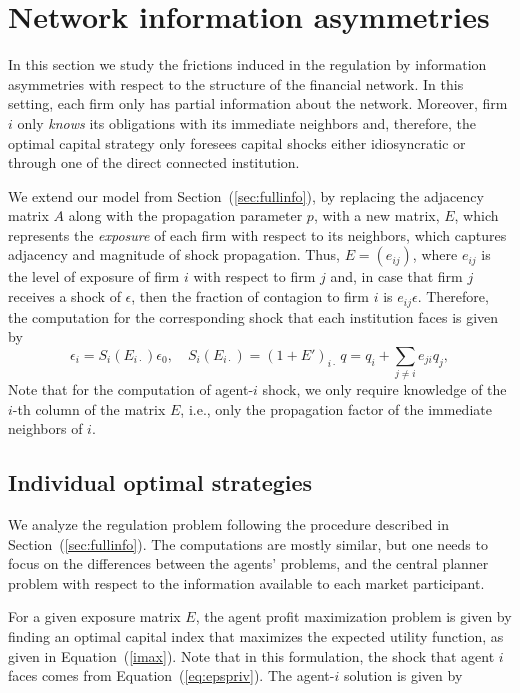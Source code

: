 \section{Network information asymmetries}
In this section we study the frictions induced in the regulation by information asymmetries with respect to the structure of the financial network.   In this setting, each firm only has partial information about the network.  Moreover, firm $i$ only \emph{knows}  its obligations with its immediate neighbors and, therefore, the optimal capital strategy only foresees capital shocks either idiosyncratic or through one of the direct connected institution.

We extend our model from Section~(\ref{sec:fullinfo}), by replacing the adjacency matrix $A$ along with the propagation parameter $p$, with a new matrix, $E$, which represents the \emph{exposure} of each firm with respect to its neighbors, which captures adjacency and magnitude of shock propagation.  Thus, $E=(e_{ij})$, where $e_{ij}$ is the level of exposure of firm $i$ with respect to firm $j$ and, in case that firm $j$ receives a shock of $\epsilon$, then the fraction of contagion to firm $i$ is \(e_{ij}\epsilon\).  Therefore, the computation for the corresponding shock that each institution faces is given by
\begin{equation}\label{eq:epspriv}
\epsilon_i = S_i(E_{i\cdot})\epsilon_0,\quad S_i(E_{i\cdot})=(1+E')_{i\cdot}\,q=q_i+ \sum_{j\neq i} e_{ji}q_j,
\end{equation}
Note that for the computation of agent-\(i\) shock, we only require knowledge of the \(i\)-th column of the matrix $E$, i.e., only the propagation factor of the immediate neighbors of \(i\).

\subsection{Individual optimal strategies}
We analyze the regulation problem following the procedure described in Section~(\ref{sec:fullinfo}).  The computations are mostly similar, but one needs to focus on the differences between the agents' problems, and the central planner problem with respect to the information available to each market participant.

For a given exposure matrix $E$, the agent profit maximization problem is given by finding an optimal capital index that maximizes the expected utility function, as given in Equation~(\ref{imax}).  Note that in this formulation, the shock that agent \(i\) faces comes from Equation~(\ref{eq:epspriv}).  The agent-\(i\) solution is given by

